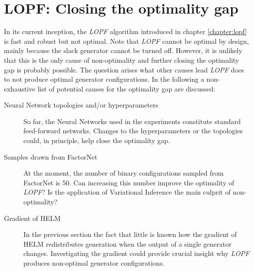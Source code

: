 \documentclass[11pt]{cmuthesis} %
\begin{document}
\section{LOPF: Closing the optimality gap}
In its current inception, the \emph{LOPF} algorithm introduced in chapter \ref{chapter:lopf} is fast and robust but not optimal. Note that \emph{LOPF} cannot be optimal by design, mainly because the slack generator cannot be turned off. However, it is unlikely that this is the only cause of non-optimality and further closing the optimality gap is probably possible. The question arises what other causes lead \emph{LOPF} does to not produce optimal generator configurations. In the following a non-exhaustive list of potential causes for the optimality gap are discussed:
\begin{description}
    \item[Neural Network topologies and/or hyperparameters] So far, the Neural Networks used in the experiments constitute standard feed-forward networks. Changes to the hyperparameters or the topologies could, in principle, help close the optimality gap.
    \item[Samples drawn from FactorNet] At the moment, the number of binary configurations sampled from FactorNet is 50. Can increasing this number improve the optimality of \emph{LOPF}? Is the application of Variational Inference the main culprit of non-optimality?
    \item[Gradient of HELM] In the previous section the fact that little is known how the gradient of HELM redistributes generation when the output of a single generator changes. Investigating the gradient could provide crucial insight why \emph{LOPF} produces non-optimal generator configurations.
\end{description}
\end{document}
